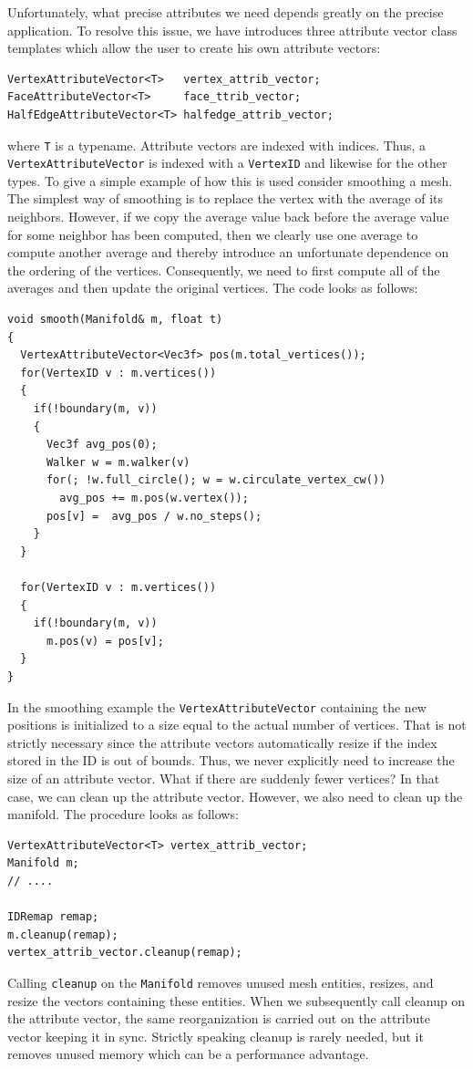 \documentclass[a4paper]{article}
\begin{document}
Unfortunately, what precise attributes we need depends greatly on the precise application. To resolve this issue, we have introduces three attribute vector class templates which allow the user to create his own attribute vectors:
\begin{verbatim}
VertexAttributeVector<T>   vertex_attrib_vector; 
FaceAttributeVector<T>     face_ttrib_vector;
HalfEdgeAttributeVector<T> halfedge_attrib_vector;
\end{verbatim}
where \texttt{T} is a typename. Attribute vectors are indexed with indices. Thus, a
\texttt{VertexAttributeVector} is indexed with a \texttt{VertexID} and likewise for the other types. To give a simple example of how this is used consider smoothing a mesh. The simplest way of smoothing is to replace the vertex with the average of its neighbors. However, if we copy the average value back before the average value for some neighbor has been computed, then we clearly use one average to compute another average and thereby introduce an unfortunate dependence on the ordering of the vertices. Consequently, we need to first compute all of the averages and then update the original vertices. The code looks as follows:
\begin{verbatim}
void smooth(Manifold& m, float t)
{
  VertexAttributeVector<Vec3f> pos(m.total_vertices());
  for(VertexID v : m.vertices())
  { 
    if(!boundary(m, v))
    {
      Vec3f avg_pos(0);
      Walker w = m.walker(v)
      for(; !w.full_circle(); w = w.circulate_vertex_cw())
        avg_pos += m.pos(w.vertex());
      pos[v] =  avg_pos / w.no_steps();
    }
  }
  
  for(VertexID v : m.vertices())
  {
    if(!boundary(m, v))
      m.pos(v) = pos[v];
  }
}
\end{verbatim}

In the smoothing example the \texttt{VertexAttributeVector} containing the new positions is initialized to a size equal to the actual number of vertices. That is not strictly necessary since the attribute vectors automatically resize if the index stored in the ID is out of bounds. Thus, we never explicitly need to increase the size of an attribute vector. What if there are suddenly fewer vertices? In that case, we can clean up the attribute vector. However, we also need to clean up the manifold. The procedure looks as follows:
\begin{verbatim}
VertexAttributeVector<T> vertex_attrib_vector; 
Manifold m;
// ....

IDRemap remap;
m.cleanup(remap);
vertex_attrib_vector.cleanup(remap);
\end{verbatim}
Calling \texttt{cleanup} on the \texttt{Manifold} removes unused mesh entities, resizes, and resize the vectors containing these entities. When we subsequently call cleanup on the attribute vector, the same reorganization is carried out on the attribute vector keeping it in sync. Strictly speaking cleanup is rarely needed, but it removes unused memory which can be a performance advantage.
\end{document}
